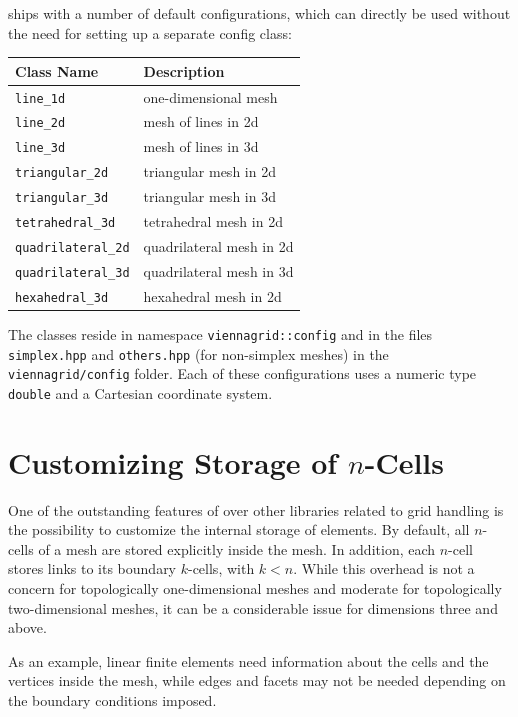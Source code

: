 {\ViennaGrid} ships with a number of default configurations, which can directly be used without the need for setting up a separate config class:
\begin{center}
 \begin{tabular}{|l|l|}
  \hline
   Class Name           & Description \\
  \hline
   \lstinline|line_1d|  & one-dimensional mesh \\
   \lstinline|line_2d|  & mesh of lines in 2d \\
   \lstinline|line_3d|  & mesh of lines in 3d \\
   \lstinline|triangular_2d| & triangular mesh in 2d \\
   \lstinline|triangular_3d| & triangular mesh in 3d \\
   \lstinline|tetrahedral_3d| & tetrahedral mesh in 2d \\
   \lstinline|quadrilateral_2d| & quadrilateral mesh in 2d \\
   \lstinline|quadrilateral_3d| & quadrilateral mesh in 3d \\
   \lstinline|hexahedral_3d| & hexahedral mesh in 2d \\
  \hline
 \end{tabular}
\end{center}
The classes reside in namespace \lstinline|viennagrid::config| and in the files \lstinline|simplex.hpp| and \lstinline|others.hpp| (for non-simplex meshes) in the \lstinline|viennagrid/config| folder.
Each of these configurations uses a numeric type \lstinline|double| and a Cartesian coordinate system.

\section{Customizing Storage of $n$-Cells} \label{sec:customizing-storage}
One of the outstanding features of {\ViennaGrid} over other libraries related to grid handling is the possibility to customize the internal storage of elements. By default, all $n$-cells of a mesh are stored explicitly inside the mesh. In addition, each $n$-cell stores links to its boundary $k$-cells, with $k<n$. While this overhead is not a concern for topologically one-dimensional meshes and moderate for topologically two-dimensional meshes, it can be a considerable issue for dimensions three and above. 

As an example, linear finite elements need information about the cells and the vertices inside the mesh, while edges and facets may not be needed depending on the boundary conditions imposed.

